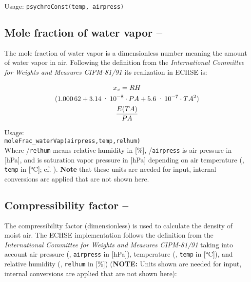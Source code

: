 \noindent
Usage:
\verb!psychroConst(temp, airpress)!\\


\subsection{Mole fraction of water vapor -- \moleFracWaterVap} \label{sec:meteo:molefracvap}
The mole fraction of water vapor is a dimensionless number meaning the amount of water vapor in air. Following the definition from the \emph{International Committee for Weights and Measures CIPM-81/91} its realization in ECHSE is:

\begin{multline}\label{eqn:meteo:molefracvap}
x_{v}{} = RH{} \\ 
(\num{1.00062} + \num{3.14e-08} \cdot PA{} + \num{5.6e-07} \cdot TA{}^2) \\
\frac{E{(TA{})}}{PA{}}
\end{multline}

\noindent
Usage:\\
\verb!moleFrac_waterVap(airpress,temp,relhum)!\\

Where \relHumidity{}/\verb!relhum! means relative humidity in [\si{\percent}], \airPressure{}/\verb!airpress! is air pressure in [\si{\hecto\pascal}], and \satVaporPressure{} is saturation vapor pressure in [\si{\hecto\pascal}] depending on air temperature (\airtemp{}, \verb!temp! in [\si{\degreeCelsius}]; cf. ). \textbf{Note} that these units are needed for input, internal conversions are applied that are not shown here.


\subsection{Compressibility factor -- \compressibilityFactor} \label{sec:meteo:compressfac}
The compressibility factor (dimensionless) is used to calculate the density of moist air. The ECHSE implementation follows the definition from the \emph{International Committee for Weights and Measures CIPM-81/91} taking into account air pressure (\airPressure{}, \verb!airpress! in [\si{\hecto\pascal}]), temperature (\airtemp{}, \verb!temp! in [\si{\degreeCelsius}]), and relative humidity (\relHumidity{}, \verb!relhum! in [\si{\percent}]) (\textbf{NOTE:} Units shown are needed for input, internal conversions are applied that are not shown here):

